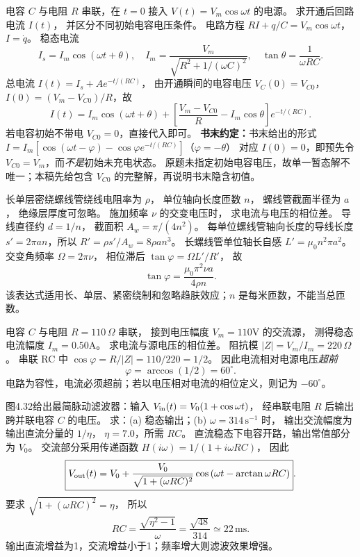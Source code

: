 电容 $C$ 与电阻 $R$ 串联，在 $t=0$ 接入
$V(t)=V_m\cos\omega t$ 的电源。
求开通后回路电流 $I(t)$，
并区分不同初始电容电压条件。
\exsolution
电路方程
$RI+q/C=V_m\cos\omega t$，
$I=\dot q$。
稳态电流
\[
I_s=I_m\cos(\omega t+\theta),\quad
I_m=\frac{V_m}{\sqrt{R^2+1/(\omega C)^2}},
\quad
\tan\theta=\frac1{\omega RC}.
\]
总电流
$I(t)=I_s+A e^{-t/(RC)}$，
由开通瞬间的电容电压 $V_C(0)=V_{C0}$，
$I(0)=(V_m-V_{C0})/R$，故
\[
\boxed{I(t)=I_m\cos(\omega t+\theta)
+\left[\frac{V_m-V_{C0}}R-I_m\cos\theta\right]
e^{-t/(RC)}}.
\]
若电容初始不带电 $V_{C0}=0$，直接代入即可。
\textbf{书末约定：}书末给出的形式
$I=I_m[\cos(\omega t-\varphi)-
\cos\varphi e^{-t/(RC)}]$（$\varphi=-\theta$）
对应 $I(0)=0$，即预先令
$V_{C0}=V_m$，而\emph{不是}初始未充电状态。
\excheck 原题未指定初始电容电压，故单一暂态解不唯一；本稿先给包含 $V_{C0}$ 的完整解，再说明书末隐含初值。

长单层密绕螺线管绕线电阻率为 $\rho$，
单位轴向长度匝数 $n$，
螺线管截面半径为 $a$，
绝缘层厚度可忽略。
施加频率 $\nu$ 的交变电压时，
求电流与电压的相位差。
\exsolution
导线直径约 $d=1/n$，
截面积 $A_w=\pi/(4n^2)$。
每单位螺线管轴向长度的导线长度
$s'=2\pi an$，所以
$R'=\rho s'/A_w=8\rho an^3$。
长螺线管单位轴长自感
$L'=\mu_0n^2\pi a^2$。
交变角频率 $\Omega=2\pi\nu$，
相位滞后
$\tan\varphi=\Omega L'/R'$，
故
\[
\boxed{\tan\varphi=
\frac{\mu_0\pi^2\nu a}{4\rho n}}.
\]
\excheck 该表达式适用长、单层、紧密绕制和忽略趋肤效应；$n$ 是每米匝数，不能当总匝数。

电容 $C$ 与电阻 $R=110\,\Omega$ 串联，
接到电压幅度 $V_m=110$V 的交流源，
测得稳态电流幅度 $I_m=0.50$A。
求电流与源电压的相位差。
\exsolution
阻抗模
$|Z|=V_m/I_m=220\,\Omega$。
串联 RC 中
$\cos\varphi=R/|Z|=110/220=1/2$。
因此电流相对电源电压\emph{超前}
\[
\boxed{\varphi=\arccos(1/2)=60^\circ}.
\]
\excheck 电路为容性，电流必须超前；若以电压相对电流的相位定义，则记为 $-60^\circ$。

图4.32给出最简脉动滤波器：输入
$V_{\rm in}(t)=V_0(1+\cos\omega t)$，
经串联电阻 $R$ 后输出跨并联电容 $C$ 的电压。
求：(a) 稳态输出；(b) $\omega=314\,\mathrm{s^{-1}}$ 时，
输出交流幅度为输出直流分量的 $1/\eta$，
$\eta=7.0$，所需 $RC$。
\exsolution
直流稳态下电容开路，输出常值部分为 $V_0$。
交流部分采用传递函数
$H(i\omega)=1/(1+i\omega RC)$，
因此
\[
\boxed{V_{\rm out}(t)=V_0+
\frac{V_0}{\sqrt{1+(\omega RC)^2}}
\cos\left(\omega t-\arctan\omega RC\right)}.
\]
要求
$\sqrt{1+(\omega RC)^2}=\eta$，
所以
\[
\boxed{RC=\frac{\sqrt{\eta^2-1}}{\omega}
=\frac{\sqrt{48}}{314}
\simeq22\,\mathrm{ms}}.
\]
\excheck 输出直流增益为1，交流增益小于1；频率增大则滤波效果增强。

